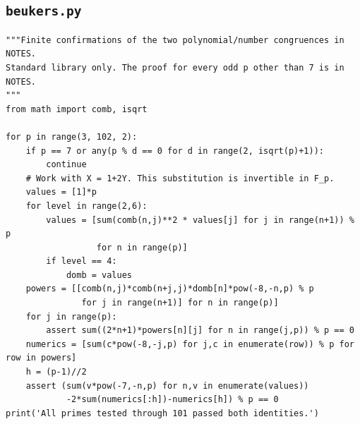 \documentclass[11pt,a4paper]{article}
\begin{document}
\subsection*{\texttt{beukers.py}}
\begin{Verbatim}[fontsize=\footnotesize,breakanywhere=false]
"""Finite confirmations of the two polynomial/number congruences in NOTES.
Standard library only. The proof for every odd p other than 7 is in NOTES.
"""
from math import comb, isqrt

for p in range(3, 102, 2):
    if p == 7 or any(p % d == 0 for d in range(2, isqrt(p)+1)):
        continue
    # Work with X = 1+2Y. This substitution is invertible in F_p.
    values = [1]*p
    for level in range(2,6):
        values = [sum(comb(n,j)**2 * values[j] for j in range(n+1)) % p
                  for n in range(p)]
        if level == 4:
            domb = values
    powers = [[comb(n,j)*comb(n+j,j)*domb[n]*pow(-8,-n,p) % p
               for j in range(n+1)] for n in range(p)]
    for j in range(p):
        assert sum((2*n+1)*powers[n][j] for n in range(j,p)) % p == 0
    numerics = [sum(c*pow(-8,-j,p) for j,c in enumerate(row)) % p for row in powers]
    h = (p-1)//2
    assert (sum(v*pow(-7,-n,p) for n,v in enumerate(values))
            -2*sum(numerics[:h])-numerics[h]) % p == 0
print('All primes tested through 101 passed both identities.')
\end{Verbatim}
\end{document}
